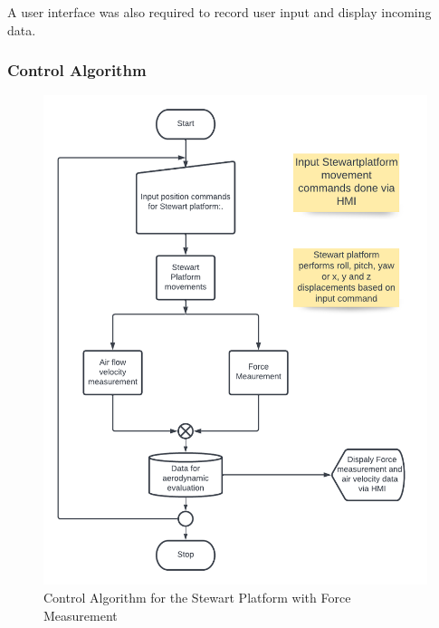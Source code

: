 A user interface was also required to record user input and display incoming data.
\subsubsection{Control Algorithm}
\begin{center}
	\begin{figure}[H]
	\centering
	\includegraphics[width=0.7\linewidth]{Figures/Flow}
	\caption[Control Algorithm]{Control Algorithm for the Stewart Platform with Force Measurement}
	\end{figure}
\end{center}
